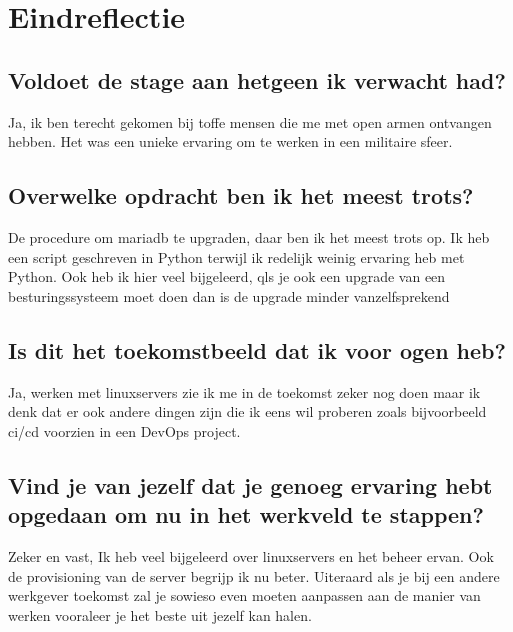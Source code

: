\section{Eindreflectie}
\label{sec:Eindreflectie}

\subsection{Voldoet de stage aan hetgeen ik verwacht had?}

Ja, ik ben terecht gekomen bij toffe mensen die me met open armen ontvangen hebben. Het was een unieke ervaring om te werken in een militaire sfeer.

\subsection{Overwelke opdracht ben ik het meest trots?}

De procedure om mariadb te upgraden, daar ben ik het meest trots op. Ik heb een script geschreven in Python terwijl ik redelijk weinig ervaring heb met Python. Ook heb ik hier veel bijgeleerd, qls je ook een upgrade van een besturingssysteem moet doen dan is de upgrade minder vanzelfsprekend 

\subsection{Is dit het toekomstbeeld dat ik voor ogen heb?}

Ja, werken met linuxservers zie ik me in de toekomst zeker nog doen maar ik denk dat er ook andere dingen zijn die ik eens wil proberen zoals bijvoorbeeld \gls{ci}/\gls{cd} voorzien in een DevOps project.

\subsection{Vind je van jezelf dat je genoeg ervaring hebt opgedaan om nu in het werkveld te stappen?}

Zeker en vast, Ik heb veel bijgeleerd over linuxservers en het beheer ervan. Ook de provisioning van de server begrijp ik nu beter. Uiteraard als je bij een andere werkgever toekomst zal je sowieso even moeten aanpassen aan de manier van werken vooraleer je het beste uit jezelf kan halen.
